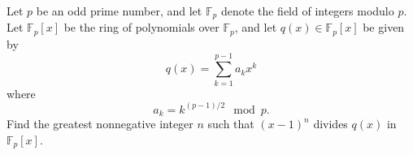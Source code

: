 Let $p$ be an odd prime number, and let $\mathbb{F}_p$ denote the field of integers modulo $p$. Let $\mathbb{F}_p[x]$ be the ring of polynomials over $\mathbb{F}_p$, and let $q(x) \in \mathbb{F}_p[x]$ be given by \[q(x) = \sum_{k=1}^{p-1} a_k x^k\] where \[a_k = k^{(p-1)/2}\mod p.\] Find the greatest nonnegative integer $n$ such that $(x-1)^n$ divides $q(x)$ in $\mathbb{F}_p[x]$.
